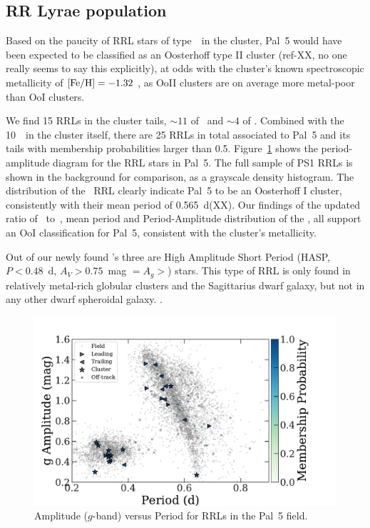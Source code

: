 \documentclass[twocolumn]{aastex63}
\begin{document}
\subsection{RR Lyrae population }

Based on the paucity of RRL stars of type~\typeab~in the cluster, Pal~5  would have been expected to be classified as an Oosterhoff type II cluster (ref-XX, no one really seems to say this explicitly), at odds with the cluster's known spectroscopic metallicity of $[\mathrm{Fe}/\mathrm{H}]=-1.32$ \citep{TODO}, as OoII clusters are on average more metal-poor than OoI clusters.

We find 15 RRLs in the cluster tails, $\sim11$ of \typeab\ and $\sim4$ of \typec. Combined with the 10~\rrc~in the cluster itself, there are 25 RRLs in total associated to Pal~5 and its tails with membership probabilities larger than 0.5. Figure~\ref{fig:PA_diagram} shows the period-amplitude diagram for the RRL stars in Pal~5. The full sample of PS1 RRLs is shown in the background for comparison, as a grayscale density histogram. The distribution of the \typeab~RRL clearly indicate Pal~5 to be an Oosterhoff I cluster, consistently with their mean period of 0.565~d(XX).  Our findings of the updated ratio of \rrab~to~\rrc, mean period and Period-Amplitude distribution of the \rrab, all support an OoI classification for Pal~5, consistent with the cluster's metallicity.

Out of our newly found \rrab's three are High Amplitude Short Period (HASP, $P <0.48$~d, $A_V>0.75$~mag $=A_g>$) stars. This type of RRL is only found in relatively metal-rich globular clusters  \citep[$\FeH>-1.5$][]{Monelli:2017} and the Sagittarius dwarf galaxy, but not in any other dwarf spheroidal galaxy. .


\begin{figure}[t]
\begin{center}
\includegraphics[width=\textwidth]{rrls_PA.pdf}
\caption{Amplitude ($g$-band) versus Period for RRLs in the Pal~5 field.}
\label{fig:PA_diagram}
\end{center}
\end{figure}
\end{document}
